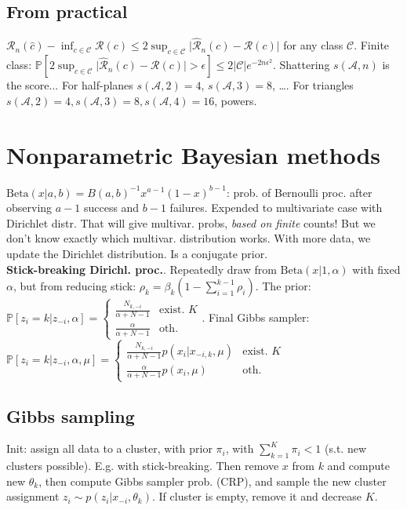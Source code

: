 \subsection*{From practical}
$\mathcal{R}_n(\hat{c})-\inf_{c\in\mathcal{C}}\mathcal{R}(c) \leq 2\sup_{c\in\mathcal{C}}\lvert \hat{\mathcal{R}}_n(c) - \mathcal{R}(c) \rvert$ for any class $\mathcal{C}$. Finite class:
$\mathbb{P}[2\sup_{c\in\mathcal{C}}\lvert \hat{\mathcal{R}}_n(c) - \mathcal{R}(c) \rvert>\epsilon]\leq 2\lvert\mathcal{C}\rvert e^{-2n\epsilon^2}$.
Shattering $s(\mathcal{A},n)$ is the score... For half-planes $s(\mathcal{A},2)=4$, $s(\mathcal{A},3)=8$, \dots. For triangles $s(\mathcal{A},2)=4,s(\mathcal{A},3)=8,s(\mathcal{A},4)=16$, powers.

\section*{Nonparametric Bayesian methods}
$\text{Beta}(x|a,b)=B(a,b)^{-1} x^{a-1}(1-x)^{b-1}$: prob. of Bernoulli proc. after observing $a-1$ success and $b-1$ failures. Expended to multivariate case with Dirichlet distr. That will give multivar. probs, \textit{based on finite} counts! But we don't know exactly which multivar. distribution works. With more data, we update the Dirichlet distribution. Is a conjugate prior.\\
\textbf{Stick-breaking Dirichl. proc.}. Repeatedly draw from $\text{Beta}(x|1,\alpha)$ with fixed $\alpha$, but from reducing stick: $\rho_k=\beta_k(1-\sum_{i=1}^{k-1}\rho_i)$. The prior:\\
$\mathbb{P}[z_i=k|z_{-i},\alpha]=\begin{cases}\frac{N_{k,-i}}{\alpha+N-1} & \text{exist. }K \\ \frac{\alpha}{\alpha+N-1} & \text{oth.}\end{cases}$. Final Gibbs sampler:\\
$\mathbb{P}[z_i=k|z_{-i},\alpha,\mu]=\begin{cases}\frac{N_{k,-i}}{\alpha+N-1}p(x_i|x_{-i,k},\mu) & \text{exist. }K \\ \frac{\alpha}{\alpha+N-1}p(x_i,\mu) & \text{oth.}\end{cases}$

\subsection*{Gibbs sampling}
Init: assign all data to a cluster, with prior $\pi_i$, with $\sum_{k=1}^K\pi_i<1$ (s.t. new clusters possible). E.g. with stick-breaking. Then remove $x$ from $k$ and compute new $\theta_k$, then compute Gibbs sampler prob. (CRP), and sample the new cluster assignment $z_i\sim p(z_i|x_{-i},\theta_k)$. If cluster is empty, remove it and decrease $K$.